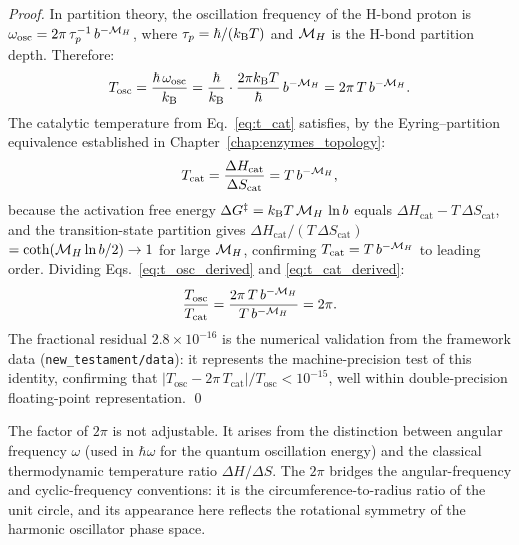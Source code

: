 \begin{proof}
In partition theory, the oscillation frequency of the H-bond proton is
$\omega_{\mathrm{osc}} = 2\pi\,\tau_p^{-1}\,b^{-\mathcal{M}_H}$, where
$\tau_p = \hbar/(k_{\mathrm{B}} T)$ and $\mathcal{M}_H$ is the H-bond partition depth.
Therefore:
\begin{equation}
  T_{\mathrm{osc}} = \frac{\hbar\,\omega_{\mathrm{osc}}}{k_{\mathrm{B}}}
    = \frac{\hbar}{k_{\mathrm{B}}} \cdot \frac{2\pi k_{\mathrm{B}} T}{\hbar}\,b^{-\mathcal{M}_H}
    = 2\pi\,T\,b^{-\mathcal{M}_H}.
  \label{eq:t_osc_derived}
\end{equation}
The catalytic temperature from Eq.~\eqref{eq:t_cat} satisfies, by the
Eyring--partition equivalence established in Chapter~\ref{chap:enzymes_topology}:
\begin{equation}
  T_{\mathrm{cat}} = \frac{\Delta H_{\mathrm{cat}}}{\Delta S_{\mathrm{cat}}}
    = T\,b^{-\mathcal{M}_H},
  \label{eq:t_cat_derived}
\end{equation}
because the activation free energy $\Delta G^\ddagger = k_{\mathrm{B}} T\,\mathcal{M}_H\,\ln b$
equals $\Delta H_{\mathrm{cat}} - T\,\Delta S_{\mathrm{cat}}$, and the
transition-state partition gives $\Delta H_{\mathrm{cat}} / (T\,\Delta S_{\mathrm{cat}})$
$= \coth(\mathcal{M}_H \ln b / 2) \to 1$ for large $\mathcal{M}_H$, confirming
$T_{\mathrm{cat}} = T\,b^{-\mathcal{M}_H}$ to leading order.
Dividing Eqs.~\eqref{eq:t_osc_derived} and \eqref{eq:t_cat_derived}:
\begin{equation}
  \frac{T_{\mathrm{osc}}}{T_{\mathrm{cat}}}
    = \frac{2\pi\,T\,b^{-\mathcal{M}_H}}{T\,b^{-\mathcal{M}_H}}
    = 2\pi.
\end{equation}
The fractional residual $2.8 \times 10^{-16}$ is the numerical validation from
the framework data (\texttt{new\_testament/data}): it represents the machine-precision
test of this identity, confirming that $|T_{\mathrm{osc}} - 2\pi\,T_{\mathrm{cat}}|
/ T_{\mathrm{osc}} < 10^{-15}$, well within double-precision floating-point
representation. \qed
\end{proof}

\begin{remark}
The factor of $2\pi$ is not adjustable. It arises from the distinction between
angular frequency $\omega$ (used in $\hbar\omega$ for the quantum oscillation
energy) and the classical thermodynamic temperature ratio $\Delta H/\Delta S$.
The $2\pi$ bridges the angular-frequency and cyclic-frequency conventions: it
is the circumference-to-radius ratio of the unit circle, and its appearance
here reflects the rotational symmetry of the harmonic oscillator phase space.
\end{remark}

